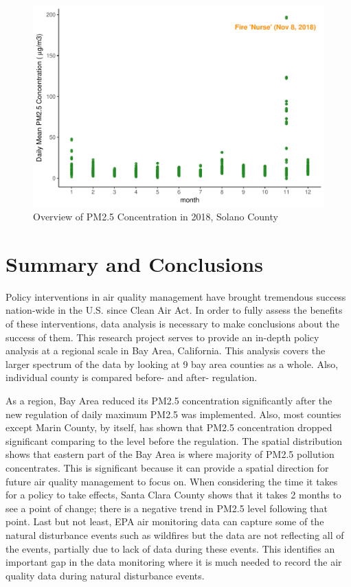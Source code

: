 \documentclass[12pt,]{article}
\begin{document}
\begin{figure}
\centering
\includegraphics{pm25_files/figure-latex/unnamed-chunk-19-1.pdf}
\caption{Overview of PM2.5 Concentration in 2018, Solano County}
\end{figure}

\newpage

\section{Summary and Conclusions}\label{summary-and-conclusions}

Policy interventions in air quality management have brought tremendous
success nation-wide in the U.S. since Clean Air Act. In order to fully
assess the benefits of these interventions, data analysis is necessary
to make conclusions about the success of them. This research project
serves to provide an in-depth policy analysis at a regional scale in Bay
Area, California. This analysis covers the larger spectrum of the data
by looking at 9 bay area counties as a whole. Also, individual county is
compared before- and after- regulation.

As a region, Bay Area reduced its PM2.5 concentration significantly
after the new regulation of daily maximum PM2.5 was implemented. Also,
most counties except Marin County, by itself, has shown that PM2.5
concentration dropped significant comparing to the level before the
regulation. The spatial distribution shows that eastern part of the Bay
Area is where majority of PM2.5 pollution concentrates. This is
significant because it can provide a spatial direction for future air
quality management to focus on. When considering the time it takes for a
policy to take effects, Santa Clara County shows that it takes 2 months
to see a point of change; there is a negative trend in PM2.5 level
following that point. Last but not least, EPA air monitoring data can
capture some of the natural disturbance events such as wildfires but the
data are not reflecting all of the events, partially due to lack of data
during these events. This identifies an important gap in the data
monitoring where it is much needed to record the air quality data during
natural disturbance events.
\end{document}
